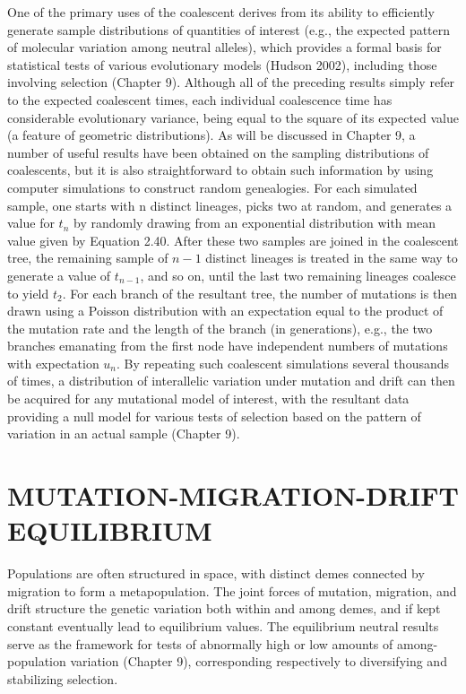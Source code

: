\documentclass{article}
\begin{document}
One of the primary uses of the coalescent derives from its ability to efficiently generate sample distributions of quantities of interest (e.g., the expected pattern of molecular variation among neutral alleles), which provides a formal basis for statistical tests of various evolutionary models (Hudson 2002), including those involving selection (Chapter 9). Although all of the preceding results simply refer to the expected coalescent times, each individual coalescence time has considerable evolutionary variance, being equal to the square of its expected value (a feature of geometric distributions). As will be discussed in Chapter 9, a number of useful results have been obtained on the sampling distributions of coalescents, but it is also straightforward to obtain such information by using computer simulations to construct random genealogies. For each simulated sample, one starts with n distinct lineages, picks two at random, and generates a value for  $ t_n $ by randomly drawing from an exponential distribution with mean value given by Equation 2.40. After these two samples are joined in the coalescent tree, the remaining sample of  $ n - 1 $ distinct lineages is treated in the same way to generate a value of  $ t_{n-1} $, and so on, until the last two remaining lineages coalesce to yield  $ t_2 $. For each branch of the resultant tree, the number of mutations is then drawn using a Poisson distribution with an expectation equal to the product of the mutation rate and the length of the branch (in generations), e.g., the two branches emanating from the first node have independent numbers of mutations with expectation  $ u_n $. By repeating such coalescent simulations several thousands of times, a distribution of interallelic variation under mutation and drift can then be acquired for any mutational model of interest, with the resultant data providing a null model for various tests of selection based on the pattern of variation in an actual sample (Chapter 9).

\section{MUTATION-MIGRATION-DRIFT EQUILIBRIUM}
Populations are often structured in space, with distinct demes connected by migration to form a metapopulation. The joint forces of mutation, migration, and drift structure the genetic variation both within and among demes, and if kept constant eventually lead to equilibrium values. The equilibrium neutral results serve as the framework for tests of abnormally high or low amounts of among-population variation (Chapter 9), corresponding respectively to diversifying and stabilizing selection.
\end{document}
